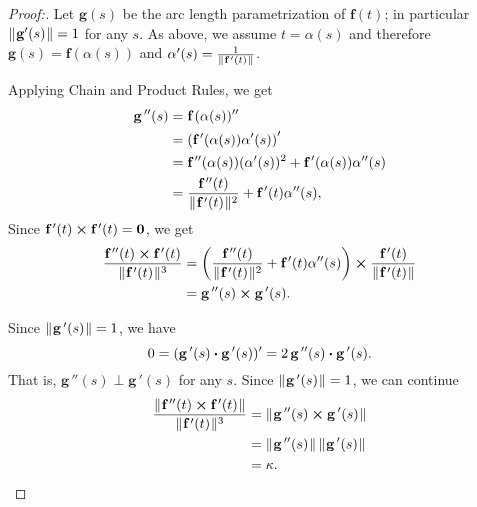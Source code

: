 \begin{proofbar}\vspace{-3mm}
\begin{proof}[Proof:]
Let $\textbf{g}(s)$ be the arc length parametrization of $\textbf{f}(t)$; in particular $\lVert\mspace{1mu}\textbf{g}'(s)\mspace{1mu}\rVert=1$ for any $s$.
As above, we assume $t=\alpha(s)$ and therefore  $\textbf{g}(s)=\textbf{f}(\alpha(s))$ and $\alpha'(s)=\frac{1}{\lVert\mspace{1mu}\textbf{f}\,'(t)\mspace{1mu}\rVert}$.

Applying Chain and Product Rules, we get
\begin{align*}
\textbf{g}\,''(s)&=\textbf{f}\,(\alpha(s))''
\\
&=\left(\textbf{f}\,'(\alpha(s))\alpha'(s)\right)'
\\
&=\textbf{f}\,''(\alpha(s))(\alpha'(s))^2+\textbf{f}\,'(\alpha(s))\alpha''(s)
\\
&=\frac{\textbf{f}\,''(t)}{\lVert\mspace{1mu}\textbf{f}\,'(t)\mspace{1mu}\rVert^2}+\textbf{f}\,'(t)\alpha''(s),
\end{align*}
Since $\textbf{f}\,'(t) \bm{\times} \textbf{f}\,'(t)=\textbf{0}$,
we get
\begin{align*}
\frac{\textbf{f}\,''(t) \bm{\times} \textbf{f}\,'(t)}{\lVert\mspace{1mu}\textbf{f}\,'(t)\mspace{1mu}\rVert^3}
&=
\left(\frac{\textbf{f}\,''(t)}{\lVert\mspace{1mu}\textbf{f}\,'(t)\mspace{1mu}\rVert^2}+\textbf{f}\,'(t)\alpha''(s)\right) \bm{\times} \frac{\textbf{f}\,'(t)}{\lVert\mspace{1mu}\textbf{f}\,'(t)\mspace{1mu}\rVert}
\\
&=
\textbf{g}\,''(s) \bm{\times} \textbf{g}\,'(s).
\end{align*}

Since $\lVert\mspace{1mu}\textbf{g}\,'(s)\mspace{1mu}\rVert=1$, we have
\[0=(\textbf{g}\,'(s) \bm{\cdot} \textbf{g}\,'(s))'=2\,\textbf{g}\,''(s) \bm{\cdot} \textbf{g}\,'(s).\]
That is, $\textbf{g}\,''(s)\perp\textbf{g}\,'(s)$ for any $s$.  Since $\lVert\mspace{1mu}\textbf{g}\,'(s)\mspace{1mu}\rVert=1$, we can continue
\begin{align*}
\frac{\lVert\mspace{1mu}\textbf{f}\,''(t) \bm{\times} \textbf{f}\,'(t)\mspace{1mu}\rVert}{\lVert\mspace{1mu}\textbf{f}\,'(t)\mspace{1mu}\rVert^3}
&=
\lVert\mspace{1mu}\textbf{g}\,''(s) \bm{\times} \textbf{g}\,'(s)\mspace{1mu}\rVert
\\
&=\lVert\mspace{1mu}\textbf{g}\,''(s)\mspace{1mu}\rVert\,\lVert\mspace{1mu}\textbf{g}\,'(s)\mspace{1mu}\rVert
\\
&=\kappa.
\end{align*}
\end{proof}\vspace{-3mm}\end{proofbar}

